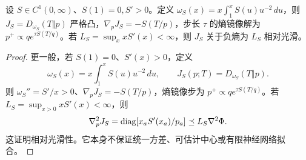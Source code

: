 \begin{proposition}[通用单调信号的镜像目标]
设 $S\in C^1(0,\infty)$、$S(1)=0,S'>0$。定义 $\omega_S(x)=x\int_1^xS(u)u^{-2}\,du$，则 $J_S=D_{\omega_S}(T\Vert p)$ 严格凸，$\nabla_pJ_S=-S(T/p)$，步长 $\tau$ 的熵镜像解为 $p^+\propto q e^{\tau S(T/q)}$。若 $L_S=\sup_x xS'(x)<\infty$，则 $J_S$ 关于负熵为 $L_S$ 相对光滑。
\end{proposition}
\begin{proof}
更一般，若 $S(1)=0$、$S'(x)>0$，定义
\begin{equation}
\omega_S(x)=x\int_1^xS(u)u^{-2}\,du,\qquad
J_S(p;T)=D_{\omega_S}(T\Vert p).
\end{equation}
则 $\omega_S''=S'/x>0$、$\nabla_pJ_S=-S(T/p)$，熵镜像步为 $p^+\propto q e^{\tau S(T/q)}$。若 $L_S=\sup_{x>0}xS'(x)<\infty$，则
\begin{equation}
\nabla_p^2J_S=\operatorname{diag}[x_aS'(x_a)/p_a]\preceq L_S\nabla^2\Phi.
\end{equation}
这证明相对光滑性。它本身不保证统一方差、可估计中心或有限神经网络拟合。
\end{proof}

